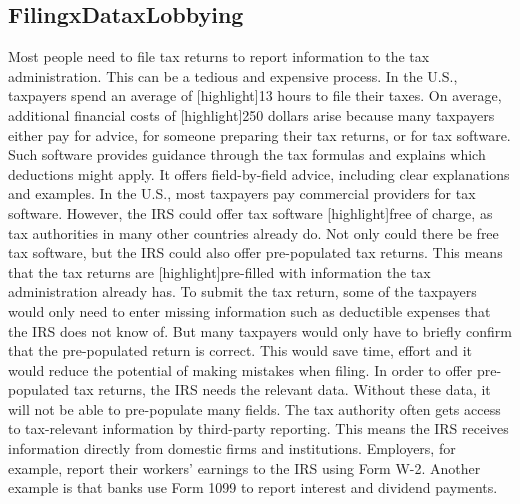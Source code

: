 \documentclass[11pt]{article}
\begin{document}
\subsection{FilingxDataxLobbying}
Most people need to file tax returns to report information to the tax administration. This can be a tedious and expensive process. In the U.S., taxpayers spend an average of [highlight]13 hours to file their taxes. On average, additional financial costs of [highlight]250 dollars arise because many taxpayers either pay for advice, for someone preparing their tax returns, or for tax software. Such software provides guidance through the tax formulas and explains which deductions might apply. It offers field-by-field advice, including clear explanations and examples. 
In the U.S., most taxpayers pay commercial providers for tax software. However, the IRS could offer tax software [highlight]free of charge, as tax authorities in many other countries already do. Not only could there be free tax software, but the IRS could also offer pre-populated tax returns. This means that the tax returns are [highlight]pre-filled with information the tax administration already has. To submit the tax return, some of the taxpayers would only need to enter missing information such as deductible expenses that the IRS does not know of. But many taxpayers would only have to briefly confirm that the pre-populated return is correct. This would save time, effort and it would reduce the potential of making mistakes when filing.
In order to offer pre-populated tax returns, the IRS needs the relevant data. Without these data, it will not be able to pre-populate many fields. 
The tax authority often gets access to tax-relevant information by third-party reporting. This means the IRS receives information directly from domestic firms and institutions. Employers, for example, report their workers’ earnings to the IRS using Form W-2.  Another example is that banks use Form 1099 to report interest and dividend payments. 
\end{document}
